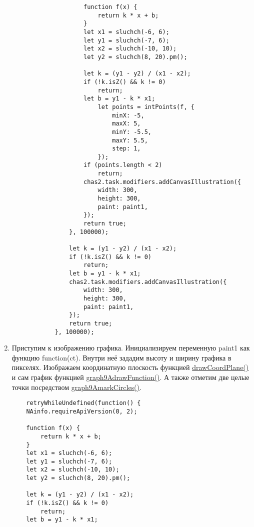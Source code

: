 \begin{enumerate}
\begin{lstlisting}
                    function f(x) {
                        return k * x + b;
                    }
                    let x1 = sluchch(-6, 6);
                    let y1 = sluchch(-7, 6);
                    let x2 = sluchch(-10, 10);
                    let y2 = sluchch(8, 20).pm();
        
                    let k = (y1 - y2) / (x1 - x2);
                    if (!k.isZ() && k != 0)
                        return;
                    let b = y1 - k * x1;
                        let points = intPoints(f, {
                            minX: -5,
                            maxX: 5,
                            minY: -5.5,
                            maxY: 5.5,
                            step: 1,
                        });
                    if (points.length < 2)
                        return;
                    chas2.task.modifiers.addCanvasIllustration({
                        width: 300,
                        height: 300,
                        paint: paint1,
                    });
                    return true;
                }, 100000);
        
                let k = (y1 - y2) / (x1 - x2);
                if (!k.isZ() && k != 0)
                    return;
                let b = y1 - k * x1;
                chas2.task.modifiers.addCanvasIllustration({
                    width: 300,
                    height: 300,
                    paint: paint1,
                });
                return true;
            }, 100000);
        \end{lstlisting}
    \item Приступим к изображению графика. Инициализируем переменную paint1 как функцию function(ct). Внутри неё зададим высоту и ширину графика в пикселях.
          Изображаем координатную плоскость функцией \hyperlink{drawCoordPlane}{drawCoordPlane()} и сам график функцией
          \hyperlink{graph9AdrawFunction}{graph9AdrawFunction()}. А также отметим две целые точки посредством \hyperlink{graph9AmarkCircles}{graph9AmarkCircles()}.
          \vspace{\baselineskip}
          
          \begin{lstlisting}
    retryWhileUndefined(function() {
	NAinfo.requireApiVersion(0, 2);

	function f(x) {
		return k * x + b;
	}
	let x1 = sluchch(-6, 6);
	let y1 = sluchch(-7, 6);
	let x2 = sluchch(-10, 10);
	let y2 = sluchch(8, 20).pm();

	let k = (y1 - y2) / (x1 - x2);
	if (!k.isZ() && k != 0)
		return;
	let b = y1 - k * x1;


\end{lstlisting}
\end{enumerate}

